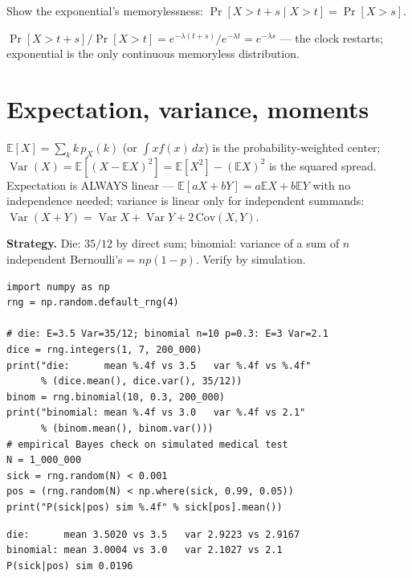 \begin{exercise}[medium]
Show the exponential's memorylessness:
$\Pr[X>t+s\mid X>t]=\Pr[X>s]$.
\begin{solution}
$\Pr[X>t+s]/\Pr[X>t]=e^{-\lambda(t+s)}/e^{-\lambda t}=e^{-\lambda s}$
--- the clock restarts; exponential is the only continuous memoryless
distribution.
\end{solution}
\end{exercise}

\section{Expectation, variance, moments}\label{sec:prob-moments}

$\mathbb E[X]=\sum_k k\,p_X(k)$ (or $\int x f(x)\,dx$) is the
probability-weighted center;
$\operatorname{Var}(X)=\mathbb E[(X-\mathbb E X)^{2}]
=\mathbb E[X^{2}]-(\mathbb E X)^{2}$ is the squared
spread. Expectation is ALWAYS linear ---
$\mathbb E[aX+bY]=a\mathbb E X+b\mathbb E Y$ with no independence needed;
variance is linear only for independent summands:
$\operatorname{Var}(X+Y)=\operatorname{Var}X+\operatorname{Var}Y+
2\,\mathrm{Cov}(X,Y)$.

\begin{example}\label{ex:dievar}
\textbf{Strategy.} Die: $35/12$ by direct sum; binomial: variance of a
sum of $n$ independent Bernoulli's = $np(1-p)$. Verify by simulation.
\end{example}

\begin{lstlisting}[caption={\ttfamily code/ch12\_sim\_theory.py ---
simulation vs.\ theory on the die, the binomial, and a million-patient
Bayes check.}]
import numpy as np
rng = np.random.default_rng(4)

# die: E=3.5 Var=35/12; binomial n=10 p=0.3: E=3 Var=2.1
dice = rng.integers(1, 7, 200_000)
print("die:      mean %.4f vs 3.5   var %.4f vs %.4f"
      % (dice.mean(), dice.var(), 35/12))
binom = rng.binomial(10, 0.3, 200_000)
print("binomial: mean %.4f vs 3.0   var %.4f vs 2.1"
      % (binom.mean(), binom.var()))
# empirical Bayes check on simulated medical test
N = 1_000_000
sick = rng.random(N) < 0.001
pos = (rng.random(N) < np.where(sick, 0.99, 0.05))
print("P(sick|pos) sim %.4f" % sick[pos].mean())
\end{lstlisting}

\begin{lstlisting}[caption={Output of simulation vs.\ theory. Notice the
Bayes simulation lands on the computed $0.0194$ --- the population-level
check of Example~\ref{ex:bayes}.}]
die:      mean 3.5020 vs 3.5   var 2.9223 vs 2.9167
binomial: mean 3.0004 vs 3.0   var 2.1027 vs 2.1
P(sick|pos) sim 0.0196
\end{lstlisting}

